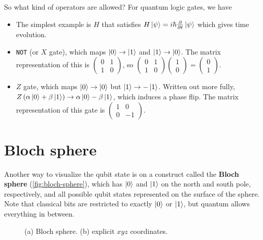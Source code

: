 \documentclass[12pt, english]{book}
\begin{document}
So what kind of operators are allowed?
For quantum logic gates, we have
\begin{itemize}
	\item The simplest example is $H$ that satisfies $H \ket{\psi} = i \hbar \pdv{t} \ket{\psi}$ which gives time evolution.
	
	\item \texttt{NOT} (or $X$ gate), which maps $\ket{0} \rightarrow \ket{1}$ and $\ket{1} \rightarrow \ket{0}$.
	The matrix representation of this is $\begin{pmatrix} 0 & 1 \\ 1 & 0 \end{pmatrix}$, so $\begin{pmatrix} 0 & 1 \\ 1 & 0 \end{pmatrix} \begin{pmatrix} 1 \\ 0 \end{pmatrix} = \begin{pmatrix} 0 \\ 1 \end{pmatrix}$.
	
	\item $Z$ gate, which maps $\ket{0} \rightarrow \ket{0}$ but $\ket{1} \rightarrow -\ket{1}$.
	Written out more fully, $Z \left( \alpha \ket{0} + \beta \ket{1} \right) \rightarrow \alpha \ket{0} - \beta \ket{1}$, which induces a phase flip. 
	The matrix representation of this gate is $\begin{pmatrix} 1 & 0 \\ 0 & -1 \end{pmatrix}$.
\end{itemize}


\section{Bloch sphere}

Another way to visualize the qubit state is on a construct called the \textbf{Bloch sphere} (\autoref{fig:bloch-sphere}), which has $\ket{0}$ and $\ket{1}$ on the north and south pole, respectively, and all possible qubit states represented on the surface of the sphere.
Note that classical bits are restricted to exactly $\ket{0}$ or $\ket{1}$, but quantum allows everything in between.

\begin{figure}[!ht]
	\centering
	 \hspace{10ex}
	\caption{(a) Bloch sphere. (b) explicit $xyz$ coordinates.}
	\label{fig:bloch-sphere}
\end{figure}
\end{document}
